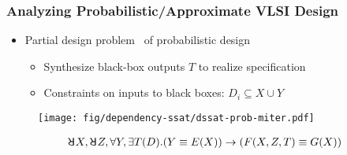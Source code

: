 \begin{frame}
      \frametitle{Analyzing Probabilistic/Approximate VLSI Design}
      \begin{itemize}
            \item Partial design problem~\cite{Gitina2013} of probabilistic design
                  \begin{itemize}
                        \item Synthesize black-box outputs $T$ to realize specification
                        \item \alert{Constraints on inputs} to black boxes: $D_i \subseteq X \cup Y$
                  \end{itemize}
      \end{itemize}
      \begin{figure}
            \centering
            \texttt{[image: fig/dependency-ssat/dssat-prob-miter.pdf]}
      \end{figure}
      \begin{align*}
            \random{} X,\random{} Z,\forall Y,\exists T(D).
            (Y \equiv E(X)) \limply (F(X,Z,T) \equiv G(X))
      \end{align*}
\end{frame}